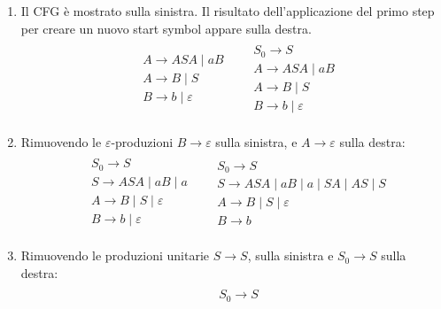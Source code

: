 \documentclass[italian]{article}
\newcommand{\taleche}{\;|\;}
\begin{document}
\begin{enumerate}
	\item Il CFG è mostrato sulla sinistra. Il risultato dell'applicazione del primo step per creare un nuovo start symbol appare sulla destra.
		\begin{gather*}
			\begin{align*}
				\begin{split}
					& A \to ASA \taleche aB \\
					& A \to B \taleche S \\
					& B \to b \taleche \varepsilon
				\end{split}
				&
				\begin{split}
					& S_0 \to S \\
					& A \to ASA \taleche aB \\
					& A \to B \taleche S \\
					& B \to b \taleche \varepsilon
				\end{split}
			\end{align*}
		\end{gather*}
	\item Rimuovendo le $\varepsilon$-produzioni $B \to \varepsilon$ sulla sinistra, e $A \to \varepsilon$ sulla destra:
		\begin{gather*}
		\begin{align*}
		\begin{split}
		& S_0 \to S \\
		& S \to ASA \taleche aB \taleche a \\
		& A \to B \taleche S \taleche \varepsilon \\
		& B \to b \taleche \varepsilon
		\end{split}
		&
		\begin{split}
		& S_0 \to S \\
		& S \to ASA \taleche aB \taleche a \taleche SA \taleche AS \taleche S\\
		& A \to B \taleche S \taleche \varepsilon \\
		& B \to b 
		\end{split}
		\end{align*}
		\end{gather*}
	\item Rimuovendo le produzioni unitarie $S \to S$, sulla sinistra e $S_0 \to S$ sulla destra:
			\begin{gather*}
	\begin{align*}
	\begin{split}
	& S_0 \to S \\

\end{split}
\end{align*}
\end{gather*}
\end{enumerate}
\end{document}
